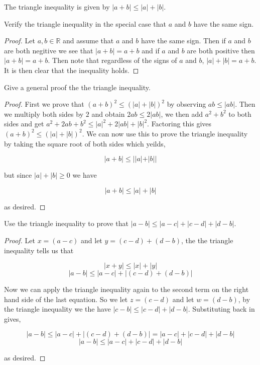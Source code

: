 \documentclass[11pt,largemargins]{homework}
\newcommand{\R}{\mathbb{R}}
\begin{document}
\question
The triangle inequality is given by $|a+b| \leq |a| + |b| $.
    \begin{alphaparts}
        \questionpart
            Verify the triangle inequality in the special case that $a$ and $b$ have the same sign. 
            
            \begin{proof}
                Let $a,b \in \R$ and assume that $a $ and $b$ have the same sign. Then if $a$ and $b$ are both negitive we see that $|a + b| = a + b$ and if $a$ and $b$ are both positive then $|a + b| = a + b$. Then note that regardless of the signs of $a$ and $b$, $|a| + |b| = a + b$.
                It is then clear that the inequality holds. 
            \end{proof}
        \questionpart
            Give a general proof the the triangle inequality. 

            \begin{proof}
                First we prove that $(a + b)^2 \leq (|a| + |b|)^2 $ by observing $ab \leq |ab| $. Then we multiply both sides by $2$ and obtain $2ab \leq 2|ab|$, we then add $a^2 + b^2$ to both sides and get $a^2 + 2ab + b^2 \leq |a|^2 + 2|ab| + |b|^2$. Factoring this gives 
                $(a + b)^2  \leq (|a| + |b|)^2$. We can now use this to prove the triangle inequality by taking the square root of both sides which yeilds, 

                \[
                    |a + b| \leq ||a| + |b|| 
                \]

                but since $|a| + |b| \geq 0$ we have 

                \[
                    |a + b| \leq |a| + |b|
                \]

                as desired. 
            
            \end{proof}

        \questionpart
            Use the triangle inequality to prove that $|a - b| \leq |a - c| + |c - d| + |d - b|$. 

            \begin{proof}
                Let $x = (a - c)$ and let $y = (c - d) + (d - b)$, the the triangle inequality tells us that 

                \[ |x + y| \leq |x| + |y| \] 
                \[ |a - b| \leq |a - c| + |(c - d) + (d - b)| \] 

                Now we can apply the triangle inequality again to the second term on the right hand side of the last 
                equation. So we let $z = (c - d)$ and let $w = (d - b)$, by the triangle inequality we the have $|c - b| \leq |c - d| + |d - b|$. 
                Substituting back in gives, 

                \[ |a - b| \leq |a - c| + |(c - d) + (d - b)| = |a - c| + |c - d| + |d - b| \] 
                \[|a - b| \leq |a - c| + |c - d| + |d - b|\]

                as desired. 

            \end{proof}

            
    \end{alphaparts}
\end{document}
